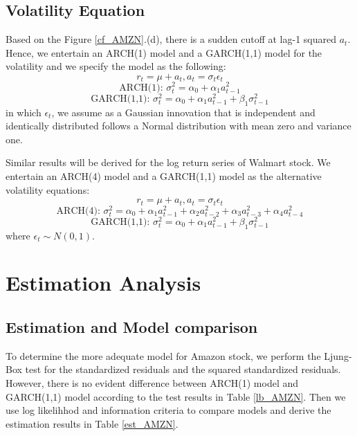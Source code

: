 \documentclass[paper=a4, fontsize=11pt]{article}
\begin{document}
\subsection{Volatility Equation}
Based on the Figure \ref{cf_AMZN}.(d), there is a sudden cutoff at lag-1 squared $a_t$. Hence, we entertain an ARCH(1) model and a GARCH(1,1) model for the volatility and we specify the model as the following:
\[ r_t = \mu+a_t, a_t = \sigma_t \epsilon_t \]
\[ \text{ARCH(1): } \sigma_t^2 = \alpha_0+\alpha_1 a_{t-1}^2 \]
\[ \text{GARCH(1,1): } \sigma_t^2= \alpha_0+\alpha_1 a_{t-1}^2+\beta_1 \sigma_{t-1}^2 \]
in which $\epsilon_t$, we assume as a Gaussian innovation that is independent and identically distributed follows a Normal distribution with mean zero and variance one.

Similar results will be derived for the log return series of Walmart stock. We entertain an ARCH(4) model and a GARCH(1,1) model as the alternative volatility equations:
\[ r_t = \mu+a_t, a_t = \sigma_t \epsilon_t \]
\[ \text{ARCH(4): } \sigma_t^2 = \alpha_0+\alpha_1 a_{t-1}^2+\alpha_2 a_{t-2}^2+\alpha_3 a_{t-3}^2+\alpha_4 a_{t-4}^2 \]
\[ \text{GARCH(1,1): } \sigma_t^2= \alpha_0+\alpha_1 a_{t-1}^2+\beta_1 \sigma_{t-1}^2 \]
where $\epsilon_t \sim N(0,1)$.


\section{Estimation Analysis}
\subsection{Estimation and Model comparison}
To determine the more adequate model for Amazon stock, we perform the Ljung-Box test for the standardized residuals and the squared standardized residuals. However, there is no evident difference between ARCH(1) model and GARCH(1,1) model according to the test results in Table \ref{lb_AMZN}. Then we use log likelihhod and information criteria to compare models and derive the estimation results in Table \ref{est_AMZN}.
\end{document}
